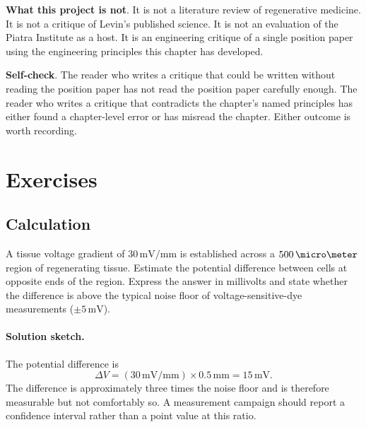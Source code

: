 \begin{project}
\textbf{What this project is not}. It is not a literature review of
regenerative medicine. It is not a critique of Levin's published
science. It is not an evaluation of the Piatra Institute as a host. It
is an engineering critique of a single position paper using the
engineering principles this chapter has developed.

\textbf{Self-check}. The reader who writes a critique that could be
written without reading the position paper has not read the position
paper carefully enough. The reader who writes a critique that
contradicts the chapter's named principles has either found a
chapter-level error or has misread the chapter. Either outcome is
worth recording.

\end{project}

\section{Exercises}

\subsection*{Calculation}

\begin{exercise}
A tissue voltage gradient of $30\,\text{mV}/\text{mm}$ is established
across a $500\,\micro\meter$ region of regenerating tissue. Estimate
the potential difference between cells at opposite ends of the region.
Express the answer in millivolts and state whether the difference is
above the typical noise floor of voltage-sensitive-dye measurements
($\pm 5\,\text{mV}$).

\paragraph{Solution sketch.}
The potential difference is
\[
\Delta V = (30\,\text{mV}/\text{mm}) \times 0.5\,\text{mm} = 15\,\text{mV}.
\]
The difference is approximately three times the noise floor and is
therefore measurable but not comfortably so. A measurement campaign
should report a confidence interval rather than a point value at this
ratio.
\end{exercise}

